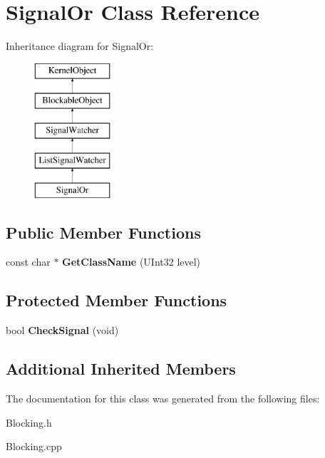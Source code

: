 \hypertarget{class_signal_or}{}\section{Signal\+Or Class Reference}
\label{class_signal_or}
Inheritance diagram for Signal\+Or\+:\begin{figure}[H]
\begin{center}
\leavevmode
\includegraphics[height=5.000000cm]{class_signal_or}
\end{center}
\end{figure}
\subsection*{Public Member Functions}
\begin{DoxyCompactItemize}
\item 
\mbox{\label{class_signal_or_a1fa830f372211e238fbf8bfe0374becb}} 
const char $\ast$ {\bfseries Get\+Class\+Name} (U\+Int32 level)
\end{DoxyCompactItemize}
\subsection*{Protected Member Functions}
\begin{DoxyCompactItemize}
\item 
\mbox{\label{class_signal_or_ad20d67e54e40c9c7be438cd42c4eb687}} 
bool {\bfseries Check\+Signal} (void)
\end{DoxyCompactItemize}
\subsection*{Additional Inherited Members}


The documentation for this class was generated from the following files\+:\begin{DoxyCompactItemize}
\item 
Blocking.\+h\item 
Blocking.\+cpp\end{DoxyCompactItemize}
